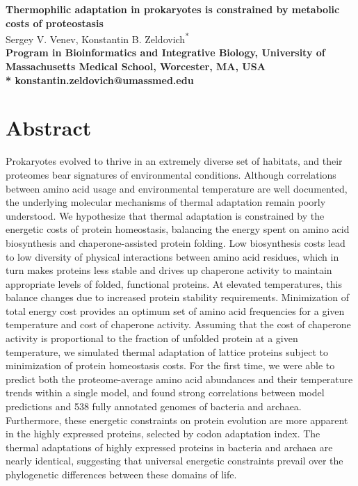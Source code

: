 \documentclass[10pt,letterpaper]{article}
\date{}
\begin{document}
\vspace*{0.35in}


\begin{flushleft}
{\Large
\textbf{Thermophilic adaptation in prokaryotes is constrained by metabolic costs of proteostasis}
}
\newline
\\
Sergey V. Venev, 
Konstantin B. Zeldovich\textsuperscript{*}
\\
\bigskip
\bf{} Program in Bioinformatics and Integrative Biology, University of Massachusetts Medical School, Worcester, MA, USA
\\
\bigskip
* konstantin.zeldovich@umassmed.edu
\end{flushleft}

\section*{Abstract}
Prokaryotes evolved to thrive in an extremely diverse set of habitats, and their proteomes bear signatures of environmental conditions. Although correlations between amino acid usage and environmental temperature are well documented, the underlying molecular mechanisms of thermal adaptation remain poorly understood. We hypothesize that thermal adaptation is constrained by the energetic costs of protein homeostasis, balancing the energy spent on amino acid biosynthesis and chaperone-assisted protein folding. Low biosynthesis costs lead to low diversity of physical interactions between amino acid residues, which in turn makes proteins less stable and drives up chaperone activity to maintain appropriate levels of folded, functional proteins. At elevated temperatures, this balance changes due to increased protein stability requirements. Minimization of total energy cost provides an optimum set of amino acid frequencies for a given temperature and cost of chaperone activity. Assuming that the cost of chaperone activity is proportional to the fraction of unfolded protein at a given temperature, we simulated thermal adaptation of lattice proteins subject to minimization of protein homeostasis costs. For the first time, we were able to predict both the proteome-average amino acid abundances and their temperature trends within a single model, and found strong correlations between model predictions and 538 fully annotated genomes of bacteria and archaea. Furthermore, these energetic constraints on protein evolution are more apparent in the highly expressed proteins, selected by codon adaptation index. The thermal adaptations of highly expressed proteins in bacteria and archaea are nearly identical, suggesting that universal energetic constraints prevail over the phylogenetic differences between these domains of life.
\end{document}

